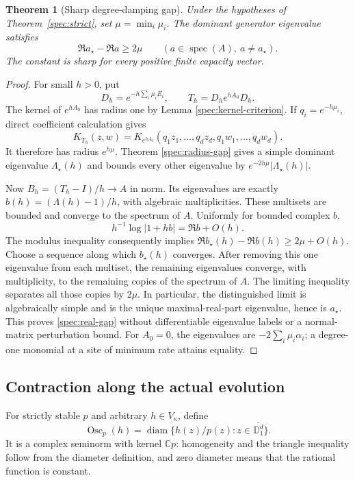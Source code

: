 \documentclass[reqno]{amsart}
\newtheorem{theorem}{Theorem}[section]
\theoremstyle{definition}
\theoremstyle{remark}
\newcommand{\C}{\mathbb C}
\newcommand{\D}{\mathbb D}
\begin{document}
\begin{theorem}[Sharp degree-damping gap]\label{spec:gap}
Under the hypotheses of Theorem~\ref{spec:strict}, set
\(\mu=\min_i\mu_i\).  The dominant generator eigenvalue satisfies
\begin{equation}\label{spec:real-gap}
 \Re a_\star-\Re a\ge2\mu
 \qquad(a\in\operatorname{spec}(A),\ a\ne a_\star).
\end{equation}
The constant is sharp for every positive finite capacity vector.
\end{theorem}
\begin{proof}
For small \(h>0\), put
\[
 D_h=e^{-h\sum_i\mu_iE_i},\qquad
 T_h=D_he^{hA_0}D_h.
\]
The kernel of \(e^{hA_0}\) has radius one by Lemma
\ref{spec:kernel-criterion}.  If \(q_i=e^{-h\mu_i}\), direct
coefficient calculation gives
\[
 K_{T_h}(z,w)=K_{e^{hA_0}}(q_1z_1,\ldots,q_dz_d,
                              q_1w_1,\ldots,q_dw_d).
\]
It therefore has radius \(e^{h\mu}\).  Theorem
\ref{spec:radius-gap} gives a simple dominant eigenvalue
\(\Lambda_\star(h)\) and bounds every other eigenvalue by
\(e^{-2h\mu}|\Lambda_\star(h)|\).

Now \(B_h=(T_h-I)/h\to A\) in norm.  Its eigenvalues are exactly
\(b(h)=(\Lambda(h)-1)/h\), with algebraic multiplicities.  These
multisets are bounded and converge to the spectrum of \(A\).  Uniformly
for bounded complex \(b\),
\[
 h^{-1}\log|1+hb|=\Re b+O(h).
\]
The modulus inequality consequently implies
\(\Re b_\star(h)-\Re b(h)\ge2\mu+O(h)\).
Choose a sequence along which \(b_\star(h)\) converges.  After removing
this one eigenvalue from each multiset, the remaining eigenvalues
converge, with multiplicity, to the remaining copies of the spectrum
of \(A\).  The limiting inequality separates all those copies by
\(2\mu\).  In particular, the distinguished limit is algebraically
simple and is the unique maximal-real-part eigenvalue, hence is
\(a_\star\).  This proves \eqref{spec:real-gap} without
differentiable eigenvalue labels or a normal-matrix perturbation bound.
For \(A_0=0\), the eigenvalues are \(-2\sum_i\mu_i\alpha_i\);
a degree-one monomial at a site of minimum rate attains equality.
\end{proof}

\subsection{Contraction along the actual evolution}

For strictly stable \(p\) and arbitrary \(h\in V_\kappa\), define
\begin{equation}\label{spec:osc-definition}
 \operatorname{Osc}_p(h)
 =\operatorname{diam}\{h(z)/p(z):z\in\overline{\D_1^d}\}.
\end{equation}
It is a complex seminorm with kernel \(\C p\): homogeneity and the
triangle inequality follow from the diameter definition, and zero
diameter means that the rational function is constant.
\end{document}
